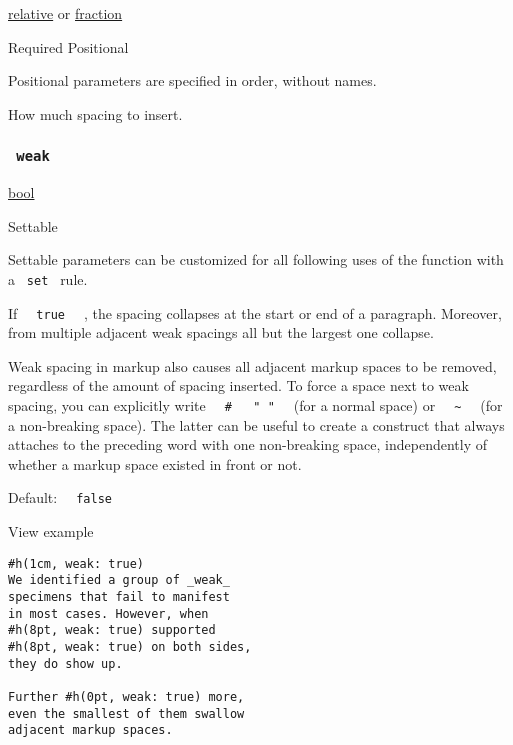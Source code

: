 \href{/docs/reference/layout/relative/}{relative} {or}
\href{/docs/reference/layout/fraction/}{fraction}

{Required} {{ Positional }}

\label{parameters-amount-positional-tooltip}
Positional parameters are specified in order, without names.

How much spacing to insert.

\subsubsection{\texorpdfstring{\texttt{\ weak\ }}{ weak }}\label{parameters-weak}

\href{/docs/reference/foundations/bool/}{bool}

{{ Settable }}

\label{parameters-weak-settable-tooltip}
Settable parameters can be customized for all following uses of the
function with a \texttt{\ set\ } rule.

If \texttt{\ }{\texttt{\ true\ }}\texttt{\ } , the spacing collapses at
the start or end of a paragraph. Moreover, from multiple adjacent weak
spacings all but the largest one collapse.

Weak spacing in markup also causes all adjacent markup spaces to be
removed, regardless of the amount of spacing inserted. To force a space
next to weak spacing, you can explicitly write
\texttt{\ }{\texttt{\ \#\ }}\texttt{\ }{\texttt{\ "\ "\ }}\texttt{\ }
(for a normal space) or
\texttt{\ }{\texttt{\ \textasciitilde{}\ }}\texttt{\ } (for a
non-breaking space). The latter can be useful to create a construct that
always attaches to the preceding word with one non-breaking space,
independently of whether a markup space existed in front or not.

Default: \texttt{\ }{\texttt{\ false\ }}\texttt{\ }


View example

\begin{verbatim}
#h(1cm, weak: true)
We identified a group of _weak_
specimens that fail to manifest
in most cases. However, when
#h(8pt, weak: true) supported
#h(8pt, weak: true) on both sides,
they do show up.

Further #h(0pt, weak: true) more,
even the smallest of them swallow
adjacent markup spaces.
\end{verbatim}

